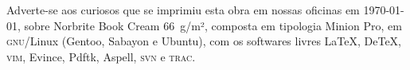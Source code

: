 \pagebreak
\ifodd\thepage\blank\else\relax\fi

\thispagestyle{empty}
\mbox{}\vfill

\begin{adjustwidth}{.15\textwidth}{.15\textwidth}
{\noindent\centering\footnotesize
Adverte-se aos curiosos que se imprimiu esta obra em nossas oficinas em \today,
sobre Norbrite Book Cream 66~g/m², composta em tipologia Minion Pro, em
\textsc{gnu}/Linux (Gentoo, Sabayon e Ubuntu), com os softwares livres \LaTeX,
De\TeX, \textsc{vim}, Evince, Pdftk, Aspell, \textsc{svn} e \textsc{trac}.\par}
\end{adjustwidth}


